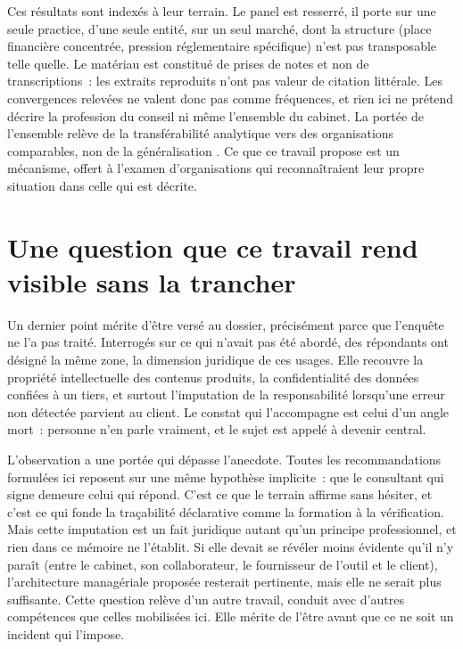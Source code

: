 Ces résultats sont indexés à leur terrain. Le panel est resserré, il porte sur une seule
practice, d'une seule entité, sur un seul marché, dont la structure (place
financière concentrée, pression réglementaire spécifique) n'est pas transposable telle
quelle. Le matériau est constitué de prises de notes et non de transcriptions~: les extraits
reproduits n'ont pas valeur de citation littérale. Les convergences relevées ne valent donc
pas comme fréquences, et rien ici ne prétend décrire la profession du conseil ni même
l'ensemble du cabinet. La portée de l'ensemble relève de la transférabilité analytique vers
des organisations comparables, non de la généralisation \cite{lincoln1985}. Ce que ce travail
propose est un mécanisme, offert à l'examen d'organisations qui reconnaîtraient leur propre
situation dans celle qui est décrite.

\section{Une question que ce travail rend visible sans la trancher}

Un dernier point mérite d'être versé au dossier, précisément parce que l'enquête ne l'a pas
traité. Interrogés sur ce qui n'avait pas été abordé, des répondants ont désigné la même zone,
la dimension juridique de ces usages. Elle recouvre la propriété intellectuelle des contenus
produits, la confidentialité des données confiées à un tiers, et surtout l'imputation de la
responsabilité lorsqu'une erreur non détectée parvient au client. Le constat qui l'accompagne est celui d'un
angle mort~: personne n'en parle vraiment, et le sujet est appelé à devenir central.

L'observation a une portée qui dépasse l'anecdote. Toutes les recommandations formulées ici
reposent sur une même hypothèse implicite~: que le consultant qui signe demeure celui qui
répond. C'est ce que le terrain affirme sans hésiter, et c'est ce qui fonde la traçabilité
déclarative comme la formation à la vérification. Mais cette imputation est un fait
juridique autant qu'un principe professionnel, et rien dans ce mémoire ne l'établit. Si elle
devait se révéler moins évidente qu'il n'y paraît (entre le cabinet, son collaborateur, le
fournisseur de l'outil et le client), l'architecture managériale proposée resterait
pertinente, mais elle ne serait plus suffisante. Cette question relève d'un autre travail,
conduit avec d'autres compétences que celles mobilisées ici. Elle mérite de l'être avant que
ce ne soit un incident qui l'impose.
